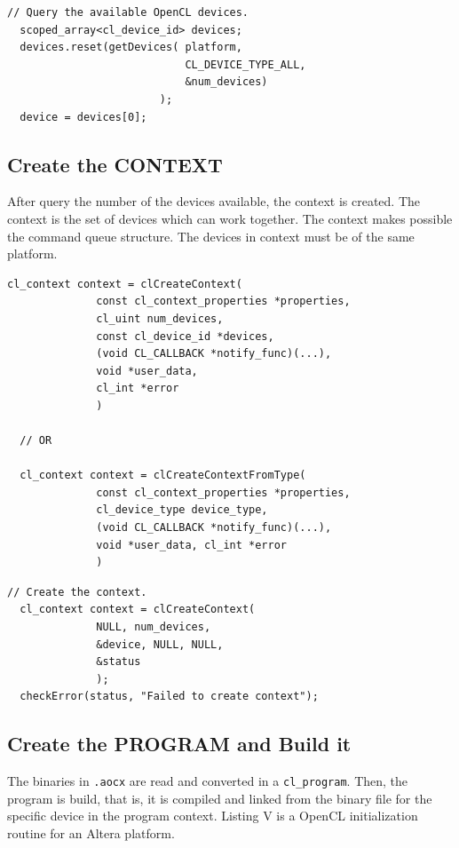 \documentclass{article}
\begin{document}
  \begin{lstlisting}[title={Intel Altera use}]
  // Query the available OpenCL devices.
  scoped_array<cl_device_id> devices;
  devices.reset(getDevices( platform,
                            CL_DEVICE_TYPE_ALL,
                            &num_devices)
                        );
  device = devices[0];
  \end{lstlisting}

  \subsection{Create the CONTEXT}
  After query the number of the devices available, the context is created. The context is the set of devices which can work together. The context makes possible the command queue structure. The devices in context must be of the same platform.

  \begin{lstlisting}[title={Normal Use}]
  cl_context context = clCreateContext(
              const cl_context_properties *properties,
              cl_uint num_devices,
              const cl_device_id *devices,
              (void CL_CALLBACK *notify_func)(...),
              void *user_data,
              cl_int *error
              )

  // OR 

  cl_context context = clCreateContextFromType(
              const cl_context_properties *properties,
              cl_device_type device_type,
              (void CL_CALLBACK *notify_func)(...),
              void *user_data, cl_int *error
              )
  \end{lstlisting}

  \begin{lstlisting}[title={Intel Altera use}]
  // Create the context.
  cl_context context = clCreateContext(
              NULL, num_devices,
              &device, NULL, NULL, 
              &status
              );
  checkError(status, "Failed to create context");
  \end{lstlisting}

  \subsection{Create the PROGRAM and Build it}
  The binaries in \texttt{.aocx} are read and converted in a \texttt{cl{\_}program}. Then, the program is build, that is, it is compiled and linked from the binary file for the specific device in the program context. Listing V is a OpenCL initialization routine for an Altera platform.
\end{document}
